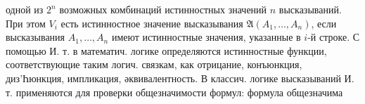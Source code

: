 \documentclass[10pt]{article}
\begin{document}
одной из $2^{n}$ возможных комбинаций истинностных значений $n$ высказываний. При этом $V_{i}$ есть истинностное значение высказывания $\mathfrak{A}\left(A_{1}, \ldots, A_{n}\right)$, если высказывания $A_{1}, \ldots, A_{n}$ имеют истинностные значения, указанные в $i$-й строке. С помощью И. т. в математич. логике определяются истинностные функции, соответствующие таким логич. связкам, как отрицание, конъюнкция, диз'Һюнкция, импликация, әквивалентность. В классич. логике высказываний И. т. применяются для проверки общезначимости формул: формула общезначима
\end{document}
